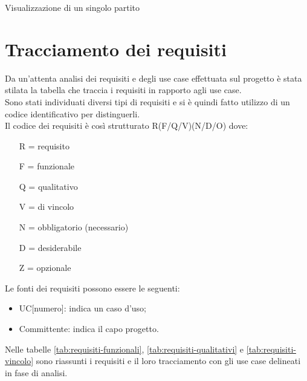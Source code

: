 \begin{usecase}{22.1}{Visualizzazione di un singolo partito}
\end{usecase}


\section{Tracciamento dei requisiti}

Da un'attenta analisi dei requisiti e degli use case effettuata sul progetto è stata stilata la tabella che traccia i requisiti in rapporto agli use case.\\
Sono stati individuati diversi tipi di requisiti e si è quindi fatto utilizzo di un codice identificativo per distinguerli.\\
Il codice dei requisiti è così strutturato R(F/Q/V)(N/D/O) dove:
\begin{enumerate}
	\item[R =] requisito
    \item[F =] funzionale
    \item[Q =] qualitativo
    \item[V =] di vincolo
    \item[N =] obbligatorio (necessario)
    \item[D =] desiderabile
    \item[Z =] opzionale
\end{enumerate}
Le fonti dei requisiti possono essere le seguenti:
\begin{itemize}
    \item UC[numero]: indica un caso d'uso;
    \item Committente: indica il capo progetto.
\end{itemize}
Nelle tabelle \ref{tab:requisiti-funzionali}, \ref{tab:requisiti-qualitativi} e \ref{tab:requisiti-vincolo} sono riassunti i requisiti e il loro tracciamento con gli use case delineati in fase di analisi.

